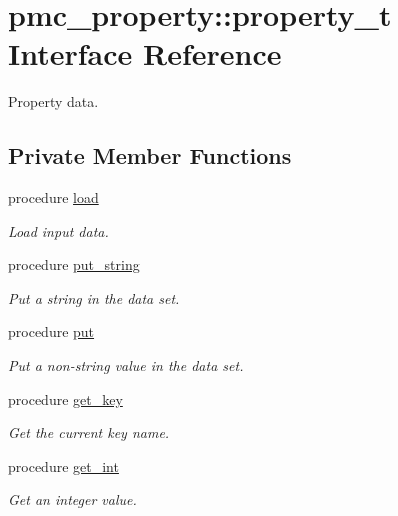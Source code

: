 \hypertarget{structpmc__property_1_1property__t}{}\section{pmc\+\_\+property\+:\+:property\+\_\+t Interface Reference}
\label{structpmc__property_1_1property__t}


Property data.  


\subsection*{Private Member Functions}
\begin{DoxyCompactItemize}
\item 
procedure \mbox{\hyperlink{structpmc__property_1_1property__t_acd27a1e946124e7997f86e633dde1090}{load}}
\begin{DoxyCompactList}\small\item\em Load input data. \end{DoxyCompactList}\item 
procedure \mbox{\hyperlink{structpmc__property_1_1property__t_a5fbfb7bb66aa477a7527a1b9e0504912}{put\+\_\+string}}
\begin{DoxyCompactList}\small\item\em Put a string in the data set. \end{DoxyCompactList}\item 
procedure \mbox{\hyperlink{structpmc__property_1_1property__t_a37ae9c5fe401b8c73daccfbb7c864d5d}{put}}
\begin{DoxyCompactList}\small\item\em Put a non-\/string value in the data set. \end{DoxyCompactList}\item 
procedure \mbox{\hyperlink{structpmc__property_1_1property__t_a4a4cd331c31336e64763d5c3219ff841}{get\+\_\+key}}
\begin{DoxyCompactList}\small\item\em Get the current key name. \end{DoxyCompactList}\item 
procedure \mbox{\hyperlink{structpmc__property_1_1property__t_a1ced8016e9d52a4b5fe74a612bc059e5}{get\+\_\+int}}
\begin{DoxyCompactList}\small\item\em Get an integer value. \end{DoxyCompactList}\item 

\end{DoxyCompactItemize}
